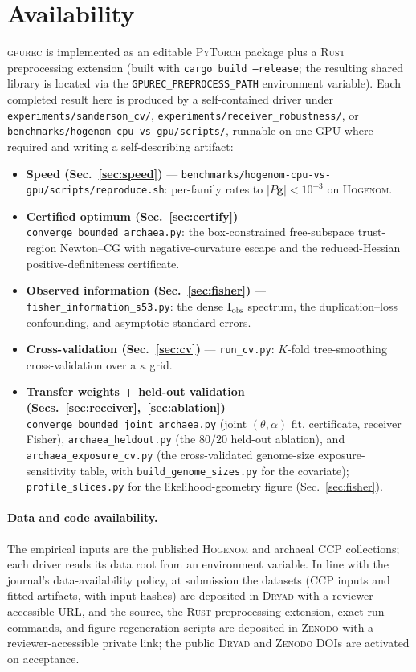 \documentclass[11pt]{article}
\newcommand{\toolname}{\textsc{gpurec}\xspace}
\newcommand{\Fish}{\mathbf{I}}
\newcommand{\grad}{\mathbf{g}}
\begin{document}
\section*{Availability}
\toolname is implemented as an editable \textsc{PyTorch} package plus a
\textsc{Rust} preprocessing extension (built with \texttt{cargo build --release};
the resulting shared library is located via the \texttt{GPUREC\_PREPROCESS\_PATH}
environment variable). Each completed result here is produced by a
self-contained driver under \texttt{experiments/sanderson\_cv/},
\texttt{experiments/receiver\_robustness/}, or
\texttt{benchmarks/hogenom-cpu-vs-gpu/scripts/}, runnable on one GPU where
required and writing a self-describing artifact:
\begin{itemize}[nosep]
\item \textbf{Speed (Sec.~\ref{sec:speed})} ---
  \texttt{benchmarks/hogenom-cpu-vs-gpu/scripts/reproduce.sh}:
  per-family rates to $|P\grad|<10^{-3}$ on \textsc{Hogenom}.
\item \textbf{Certified optimum (Sec.~\ref{sec:certify})} ---
  \texttt{converge\_bounded\_archaea.py}: the box-constrained free-subspace
  trust-region Newton--CG with negative-curvature escape and the reduced-Hessian
  positive-definiteness certificate.
\item \textbf{Observed information (Sec.~\ref{sec:fisher})} ---
  \texttt{fisher\_information\_s53.py}: the dense $\Fish_{\mathrm{obs}}$ spectrum,
  the duplication--loss confounding, and asymptotic standard errors.
\item \textbf{Cross-validation (Sec.~\ref{sec:cv})} ---
  \texttt{run\_cv.py}: $K$-fold tree-smoothing cross-validation over a $\kappa$ grid.
\item \textbf{Transfer weights + held-out validation (Secs.~\ref{sec:receiver},~\ref{sec:ablation})}
  --- \texttt{converge\_bounded\_joint\_archaea.py} (joint $(\theta,\alpha)$ fit, certificate,
  receiver Fisher), \texttt{archaea\_heldout.py} (the $80/20$ held-out ablation), and
  \texttt{archaea\_exposure\_cv.py} (the cross-validated genome-size exposure-sensitivity table,
  with \texttt{build\_genome\_sizes.py} for the covariate);
  \texttt{profile\_slices.py} for the likelihood-geometry figure (Sec.~\ref{sec:fisher}).
\end{itemize}
\paragraph{Data and code availability.} The empirical inputs are the published
\textsc{Hogenom} \citep{Penel2009} and archaeal \citep{Davin2018} CCP collections; each
driver reads its data root from an environment variable. In line with the journal's
data-availability policy, at submission the datasets (CCP inputs and fitted artifacts, with
input hashes) are deposited in \textsc{Dryad} with a reviewer-accessible URL, and the
source, the \textsc{Rust} preprocessing extension, exact run commands, and
figure-regeneration scripts are deposited in \textsc{Zenodo} with a reviewer-accessible
private link; the public \textsc{Dryad} and \textsc{Zenodo} DOIs are activated on
acceptance.
\end{document}
